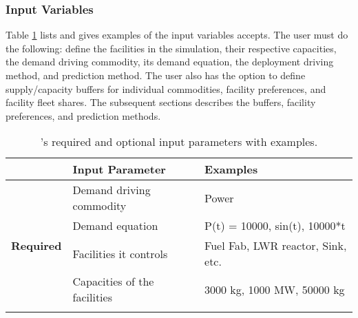 \subsubsection{\textbf{Input Variables}}
Table \ref{tab:inputs} lists and gives examples of the input 
variables \deploy accepts. 
The user must do the following: 
define the facilities in the simulation, their respective 
capacities, the demand driving commodity,
its demand equation, the deployment driving method, 
and prediction method. 
The user also has the option to define supply/capacity buffers 
for individual commodities, facility preferences, and facility 
fleet shares. 
The subsequent sections describes 
the buffers, facility preferences, and prediction methods. 

\begin{table}[]
    \centering
    \caption{\deploy's required and optional input parameters with examples.}
    \label{tab:inputs}
        \footnotesize
        \begin{tabular}{l|ll}
        \hline
            & \textbf{Input Parameter}                                                           & \textbf{Examples}                                                                                                          \\ \hline
            \multirow{5}{*}{\textbf{Required}} & Demand driving commodity                                                           & Power                                                                                                                      \\ \cline{2-3} 
                                                      & Demand equation                                                                    & P(t) = 10000, sin(t), 10000*t                                                                                                                 \\ \cline{2-3} 
                                                      & Facilities it controls                                                             & Fuel Fab, LWR reactor, Sink, etc.                                                                                                      \\ \cline{2-3} 
                                                      & Capacities of the facilities                                                       & 3000 kg, 1000 MW, 50000 kg                                                                                                     \\ \cline{2-3} 

\end{tabular}
\end{table}
